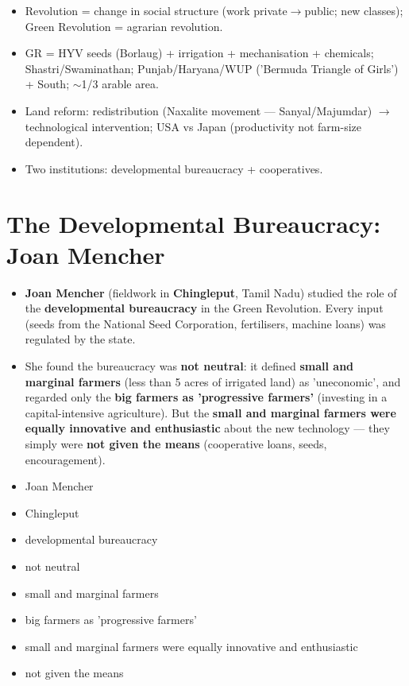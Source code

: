 \begin{QuickRevision}
\begin{itemize}
\item Revolution = change in social structure (work private$\rightarrow$public; new classes); Green Revolution = agrarian revolution.
\item GR = HYV seeds (Borlaug) + irrigation + mechanisation + chemicals; Shastri/Swaminathan; Punjab/Haryana/WUP ('Bermuda Triangle of Girls') + South; $\sim$1/3 arable area.
\item Land reform: redistribution (Naxalite movement --- Sanyal/Majumdar) $\rightarrow$ technological intervention; USA vs Japan (productivity not farm-size dependent).
\item Two institutions: developmental bureaucracy + cooperatives.
\end{itemize}
\end{QuickRevision}

\section{The Developmental Bureaucracy: Joan Mencher}

\begin{KeyConcept}
\begin{itemize}
\item \textbf{Joan Mencher} (fieldwork in \textbf{Chingleput}, Tamil Nadu) studied the role of the \textbf{developmental bureaucracy} in the Green Revolution. Every input (seeds from the National Seed Corporation, fertilisers, machine loans) was regulated by the state.
\item She found the bureaucracy was \textbf{not neutral}: it defined \textbf{small and marginal farmers} (less than 5 acres of irrigated land) as 'uneconomic', and regarded only the \textbf{big farmers as 'progressive farmers'} (investing in a capital-intensive agriculture). But the \textbf{small and marginal farmers were equally innovative and enthusiastic} about the new technology --- they simply were \textbf{not given the means} (cooperative loans, seeds, encouragement).
\end{itemize}
\end{KeyConcept}

\begin{QuickRevision}
\begin{itemize}
\item Joan Mencher
\item Chingleput
\item developmental bureaucracy
\item not neutral
\item small and marginal farmers
\item big farmers as 'progressive farmers'
\item small and marginal farmers were equally innovative and enthusiastic
\item not given the means
\end{itemize}
\end{QuickRevision}

